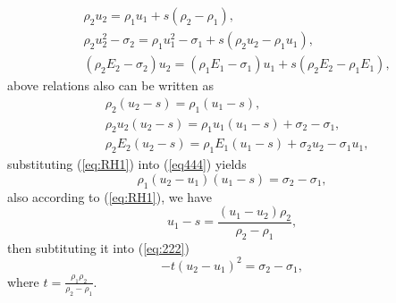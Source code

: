 \documentclass[review]{elsarticle}
\begin{document}
\begin{align}
  &\rho_2u_2 = \rho_1 u_1 +s(\rho_2 -\rho_1),\\
  &\rho_2u_2^2-\sigma_{2} = \rho_1u_1^2-\sigma_{1}+s(\rho_2u_2-\rho_1u_1), \\
  &(\rho_2E_2-\sigma_{2})u_2 = (\rho_1E_1-\sigma_{1})u_1+s(\rho_2E_2-\rho_1E_1),
\end{align}
above relations also can be written as
\begin{align}
\label{eq:RH1}
  &\rho_2(u_2-s) = \rho_1(u_1-s), \\
\label{eq444}
  &\rho_2u_2(u_2-s) = \rho_1u_1(u_1-s)+\sigma_2-\sigma_1,\\
\label{eq:RH3}
  &\rho_2E_2(u_2-s) = \rho_1E_1(u_1-s)+\sigma_2 u_2-\sigma_1u_1,
\end{align}
substituting (\ref{eq:RH1}) into (\ref{eq444}) yields  
\begin{equation}\label{eq:222}
  \rho_1(u_2-u_1)(u_1-s) = \sigma_2-\sigma_1,
\end{equation}
also according to (\ref{eq:RH1}), we have 
\begin{equation}
  u_1-s = \frac{(u_1 - u_2)\rho_2}{\rho_2 -\rho_1},
\end{equation}
then subtituting it into (\ref{eq:222})
\begin{equation}\label{eq:u2u1}
  -t(u_2-u_1)^2 = \sigma_2-\sigma_1,
\end{equation}
where $ t=\frac{\rho_1 \rho_2}{\rho_2-\rho_1}$. 
\end{document}

